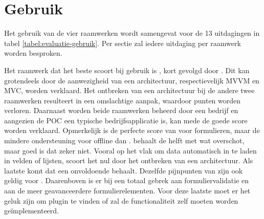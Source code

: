 \section{Gebruik}
\label{sec:evaluatie-gebruik}
Het gebruik van de vier raamwerken wordt samengevat voor de 13 uitdagingen in tabel \ref{tabel:evaluatie-gebruik}.
Per sectie zal iedere uitdaging per raamwerk worden besproken.

\begin{table}[H]
\centering
{}
\caption{Overzicht van gebruik voor \st{}~(\sta), \kendo{}~(\kendoa), \jqm{}~(\jqma) en \lungo{}~(\lungoa).}
\label{tabel:evaluatie-gebruik}
\end{table}

Het raamwerk dat het beste scoort bij gebruik is \kendo{}, kort gevolgd door \st{}.
Dit kan grotendeels door de aanwezigheid van een architectuur, respectievelijk MVVM en MVC, worden verklaard.
Het ontbreken van een architectuur bij de andere twee raamwerken resulteert in een omslachtige aanpak, waardoor punten worden verloren.
Daarnaast worden beide raamwerken beheerd door een bedrijf en aangezien de POC een typische bedrijfsapplicatie is, kan mede de goede score worden verklaard.
Opmerkelijk is de perfecte score van \kendo{} voor formulieren, maar de mindere ondersteuning voor offline dan \st{}.
\jqm{} behaalt de helft met wat overschot, maar goed is dat zeker niet.
Vooral op het vlak om data automatisch in te laden in velden of lijsten, scoort het nul door het ontbreken van een architectuur. 
Als laatste komt \lungo{} dat een onvoldoende behaalt.
Dezelfde pijnpunten van \jqm{} zijn ook geldig voor \lungo{}.
Daarenboven is er bij \lungo{} een totaal gebrek aan formuliervalidatie en aan de meer geavanceerdere formulierelementen.
Voor deze laatste moet er het geluk zijn om plugin te vinden of zal de functionaliteit zelf moeten worden geïmplementeerd. 

